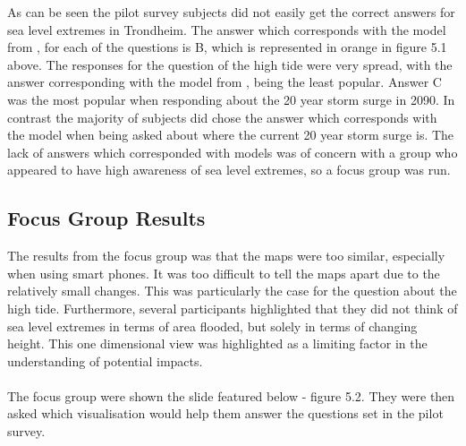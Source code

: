 As can be seen the pilot survey subjects did not easily get the correct answers for sea level extremes in Trondheim. The answer which corresponds with the model from \cite{kartverket_se_2020}, for each of the questions is B, which is represented in orange in figure 5.1 above. The responses for the question of the high tide were very spread, with the answer corresponding with the model from \cite{kartverket_se_2020}, being the least popular.  Answer C was the most popular when responding about the 20 year storm surge in 2090. In contrast the majority of subjects did chose the answer which corresponds with the model when being asked about where the current 20 year storm surge is. The lack of answers which corresponded with models was of concern with a group who appeared to have high awareness of sea level extremes, so a focus group was run. 
\paragraph{}


\subsection{Focus Group Results}
 The results from the focus group was that the maps were too similar, especially when using smart phones. It was too difficult to tell the maps apart due to the relatively small changes. This was particularly the case for the question about the high tide. Furthermore, several participants highlighted that they did not think of sea level extremes in terms of area flooded, but solely in terms of changing height. This one dimensional view was highlighted as a limiting factor in the understanding of potential impacts. 
\paragraph{}

The focus group were shown the slide featured below - figure 5.2. They were then asked which visualisation would help them answer the questions set in the pilot survey.
\paragraph{}

